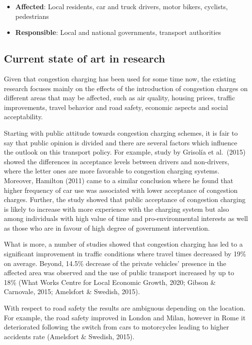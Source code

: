 \documentclass[
]{book}
\providecommand{\tightlist}{%
  \setlength{\itemsep}{0pt}\setlength{\parskip}{0pt}}
\begin{document}
\begin{itemize}
\tightlist
\item
  \textbf{Affected}: Local residents, car and truck drivers, motor bikers, cyclists, pedestrians
\item
  \textbf{Responsible}: Local and national governments, transport authorities
\end{itemize}

\hypertarget{current-state-of-art-in-research-3}{%
\subsection*{Current state of art in research}\label{current-state-of-art-in-research-3}}

Given that congestion charging has been used for some time now, the existing research focuses mainly on the effects of the introduction of congestion charges on different areas that may be affected, such as air quality, housing prices, traffic improvements, travel behavior and road safety, economic aspects and social acceptability.

Starting with public attitude towards congestion charging schemes, it is fair to say that public opinion is divided and there are several factors which influence the outlook on this transport policy. For example, study by Grisolía et al.~(2015) showed the differences in acceptance levels between drivers and non-drivers, where the letter ones are more favorable to congestion charging systems. Moreover, Hamilton (2011) came to a similar conclusion where he found that higher frequency of car use was associated with lower acceptance of congestion charges. Further, the study showed that public acceptance of congestion charging is likely to increase with more experience with the charging system but also among individuals with high value of time and pro-environmental interests as well as those who are in favour of high degree of government intervention.

What is more, a number of studies showed that congestion charging has led to a significant improvement in traffic conditions where travel times decreased by 19\% on average. Beyond, 14.5\% decrease of the private vehicles' presence in the affected area was observed and the use of public transport increased by up to 18\% (What Works Centre for Local Economic Growth, 2020; Gibson \& Carnovale, 2015; Amelsfort \& Swedish, 2015).

With respect to road safety the results are ambiguous depending on the location. For example, the road safety improved in London and Milan, however in Rome it deteriorated following the switch from cars to motorcycles leading to higher accidents rate (Amelsfort \& Swedish, 2015).
\end{document}
